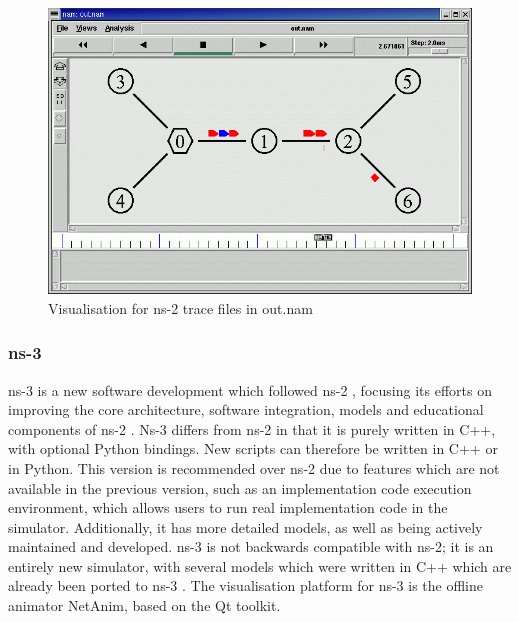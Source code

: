 \begin{figure}
\centering	
\includegraphics[scale=0.4]{img/outnam}	
\caption{ Visualisation for ns-2 trace files in out.nam}
\end{figure}

\subsubsection{ns-3}
ns-3 is a new software development which followed  ns-2 , focusing its efforts on improving the core architecture, software integration, models and educational components of ns-2 \cite{ns2006}. Ns-3 differs from ns-2 in that it is purely written in C++, with optional Python bindings. New scripts can therefore be written in C++ or in Python. This version is recommended over ns-2 due to features which are not available in the previous version, such as an implementation code execution environment, which allows users to run real implementation code in the simulator. Additionally, it has more detailed models, as well as being actively maintained and developed. ns-3 is not backwards compatible with ns-2; it is an entirely new simulator, with several models which were written in C++ which are already been ported to ns-3 \cite{tommasopecorella2016}. The visualisation platform for ns-3 is the offline animator NetAnim, based on the Qt toolkit.

